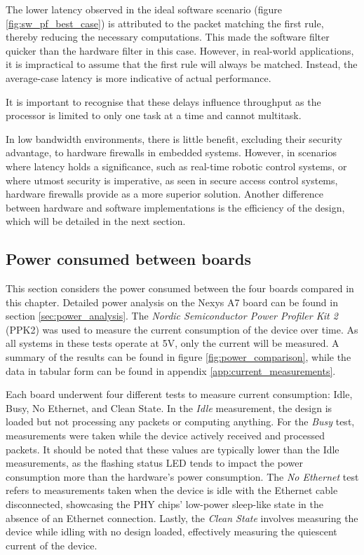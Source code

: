 The lower latency observed in the ideal software scenario (figure \ref{fig:sw_pf_best_case}) is attributed to the packet matching the first rule, thereby reducing the necessary computations. This made the software filter quicker than the hardware filter in this case. However, in real-world applications, it is impractical to assume that the first rule will always be matched. Instead, the average-case latency is more indicative of actual performance.

It is important to recognise that these delays influence throughput as the processor is limited to only one task at a time and cannot multitask. 

In low bandwidth environments, there is little benefit, excluding their security advantage, to hardware firewalls in embedded systems. However, in scenarios where latency holds a significance, such as real-time robotic control systems, or where utmost security is imperative, as seen in secure access control systems, hardware firewalls provide as a more superior solution. Another difference between hardware and software implementations is the efficiency of the design, which will be detailed in the next section. 




\subsection{Power consumed between boards}

This section considers the power consumed between the four boards compared in this chapter. Detailed power analysis on the Nexys A7 board can be found in section \ref{sec:power_analysis}. The \textit{Nordic Semiconductor Power Profiler Kit 2} (PPK2) was used to measure the current consumption of the device over time. As all systems in these tests operate at 5V, only the current will be measured. A summary of the results can be found in figure \ref{fig:power_comparison}, while the data in tabular form can be found in appendix \ref{app:current_measurements}.

Each board underwent four different tests to measure current consumption: Idle, Busy, No Ethernet, and Clean State. In the \textit{Idle} measurement, the design is loaded but not processing any packets or computing anything. For the \textit{Busy} test, measurements were taken while the device actively received and processed packets. It should be noted that these values are typically lower than the Idle measurements, as the flashing status LED tends to impact the power consumption more than the hardware's power consumption. The \textit{No Ethernet} test refers to measurements taken when the device is idle with the Ethernet cable disconnected, showcasing the PHY chips' low-power sleep-like state in the absence of an Ethernet connection. Lastly, the \textit{Clean State} involves measuring the device while idling with no design loaded, effectively measuring the quiescent current of the device.



